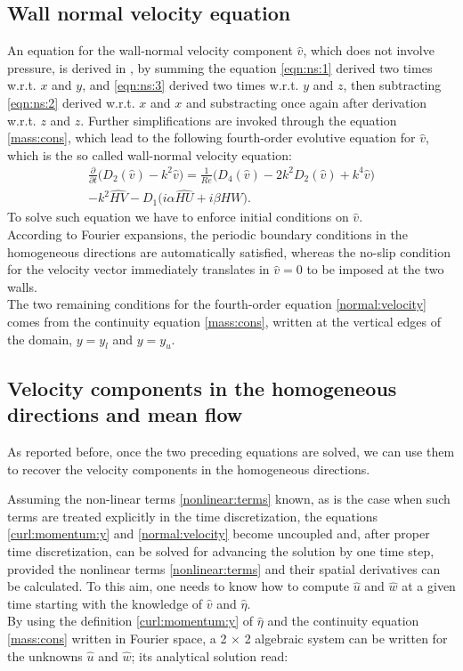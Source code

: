 \subsection{Wall normal velocity equation}
An equation for the wall-normal velocity component $\hat{v}$, which does not involve pressure, is derived in \cite{kim_moin_moser}, by summing the equation \eqref{eqn:ns:1} derived two times w.r.t. $x$ and $y$, and \eqref{eqn:ns:3} derived two times w.r.t. $y$ and $z$, then subtracting \eqref{eqn:ns:2} derived w.r.t. $x$ and $x$ and substracting once again after derivation w.r.t. $z$ and $z$.
Further simplifications are invoked through the equation \eqref{mass:cons}, which lead to the following fourth-order evolutive equation for $\hat{v}$, which is the so called wall-normal velocity equation:
\begin{multline}
\label{normal:velocity}
\frac{\partial}{\partial t} \big( D_{2}(\hat{v}) - k^{2} \hat{v} \big) = \frac{1}{Re} \big( D_{4}(\hat{v}) - 2k^{2} D_{2}(\hat{v}) + k^{4} \hat{v} \big) \\
	-k^{2} \widehat{HV} - D_{1} \big(  i \alpha \widehat{HU} + i \beta \widehat{HW} \big).
\end{multline}
To solve such equation we have to enforce initial conditions on $\hat{v}$.\\
According to Fourier expansions, the periodic boundary conditions in the homogeneous directions are automatically satisfied, whereas the no-slip condition for the velocity vector immediately translates in $\hat{v} = 0$ to be imposed at the two walls.\\
The two remaining conditions for the fourth-order equation \eqref{normal:velocity} comes from the continuity equation \eqref{mass:cons}, written at the vertical edges of the domain, $y= y_{l}$ and $y=y_{u}$.


\subsection{Velocity components in the homogeneous directions and mean flow}
As reported before, once the two preceding equations are solved, we can use them to recover the velocity components in the homogeneous directions.\par
Assuming the non-linear terms \eqref{nonlinear:terms} known, as is the case when such terms are treated explicitly in the time discretization, the equations \eqref{curl:momentum:y} and \eqref{normal:velocity} become uncoupled and, after proper time discretization, can be solved for advancing the solution by one time step, provided the nonlinear terms \eqref{nonlinear:terms} and their spatial derivatives can be calculated.
To this aim, one needs to know how to compute $\hat{u}$ and $\hat{w}$ at a given time starting with the knowledge of $\hat{v}$ and $\hat{\eta}$. \\
By using the definition \eqref{curl:momentum:y} of $\hat{\eta}$ and the continuity equation \eqref{mass:cons} written in Fourier space, a 2 $\times$ 2 algebraic system can be written for the unknowns $\hat{u}$ and $\hat{w}$; its analytical solution read:

